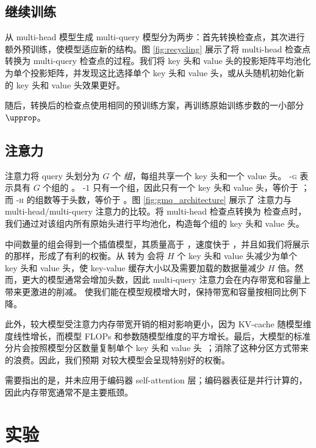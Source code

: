 \documentclass[11pt]{article}
\begin{document}
\subsection{继续训练}

从 multi-head 模型生成 multi-query 模型分为两步：首先转换检查点，其次进行额外预训练，使模型适应新的结构。图 \ref{fig:recycling} 展示了将 multi-head 检查点转换为 multi-query 检查点的过程。我们将 key 头和 value 头的投影矩阵平均池化为单个投影矩阵，并发现这比选择单个 key 头和 value 头，或从头随机初始化新的 key 头和 value 头效果更好。



随后，转换后的检查点使用相同的预训练方案，再训练原始训练步数的一小部分 $\upprop$。

\subsection{\fullgmqcap 注意力}

\fullgmqcap 注意力将 query 头划分为 $G$ 个 \emph{组}，每组共享一个 key 头和一个 value 头。 \gmq-\textsc{g} 表示具有 $G$ 个组的 \fullgmq。 \gmq-$1$ 只有一个组，因此只有一个 key 头和 value 头，等价于 \mq；而 \gmq-\textsc{h} 的组数等于头数，等价于 \mh。图 \ref{fig:gmq_architecture} 展示了 \fullgmq 注意力与 multi-head/multi-query 注意力的比较。将 multi-head 检查点转换为 \gmq 检查点时，我们通过对该组内所有原始头进行平均池化，构造每个组的 key 头和 value 头。

中间数量的组会得到一个插值模型，其质量高于 \mq，速度快于 \mh，并且如我们将展示的那样，形成了有利的权衡。从 \mh 转为 \mq 会将 $H$ 个 key 头和 value 头减少为单个 key 头和 value 头，使 key-value 缓存大小以及需要加载的数据量减少 $H$ 倍。然而，更大的模型通常会增加头数，因此 multi-query 注意力会在内存带宽和容量上带来更激进的削减。 \gmq 使我们能在模型规模增大时，保持带宽和容量按相同比例下降。

此外，较大模型受注意力内存带宽开销的相对影响更小，因为 KV-cache 随模型维度线性增长，而模型 FLOPs 和参数随模型维度的平方增长。最后，大模型的标准分片会按照模型分区数量复制单个 key 头和 value 头~\citep{palminference}；\gmq 消除了这种分区方式带来的浪费。因此，我们预期 \gmq 对较大模型会呈现特别好的权衡。

需要指出的是，\gmq 并未应用于编码器 self-attention 层；编码器表征是并行计算的，因此内存带宽通常不是主要瓶颈。

\section{实验}
\label{section:experiments}
\end{document}
